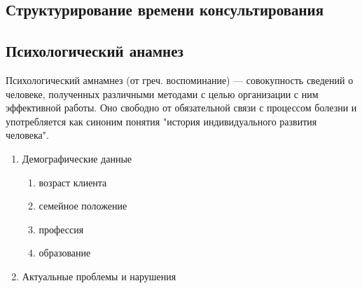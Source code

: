 \documentclass[a4paper, 12pt]{report}
\begin{document}
    \subsection*{Структурирование времени консультирования}
    
    \subsection*{Психологический анамнез}
Психологический амнамнез (от греч. воспоминание) — совокупность 
сведений о человеке, полученных различными методами с целью 
организации с ним эффективной работы. 
Оно свободно от обязательной связи с процессом болезни и употребляется 
как синоним понятия "история индивидуального развития человека". 

    \begin{enumerate}
        \setlength\itemsep{0pt}
        \item Демографические данные
        \begin{enumerate}
        \setlength\itemsep{-0.1mm}
            \item возраст клиента \item семейное положение
            \item профессия \item образование
        \end{enumerate} 
        \item Актуальные проблемы и нарушения
        \begin{enumerate}
        

\end{enumerate}
\end{enumerate}
\end{document}
